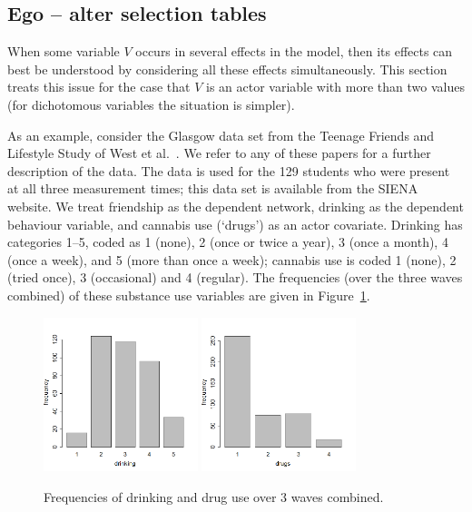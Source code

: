 \documentclass[a4paper,fleqn,11pt]{article}
\newcommand{\+}{\, + \,}
\newcommand{\SI}{{\sf SIENA }}
\begin{document}
\subsection{Ego -- alter selection tables}

When some variable $V$ occurs in several effects in the model,
then its effects can best be understood
by considering all these effects simultaneously.
This section treats this issue for the case that $V$ is an
actor variable with more than two values (for dichotomous
variables the situation is simpler).

As an example, consider the
Glasgow data set from the Teenage Friends and Lifestyle Study of
West et al.\ \citep{MichellWest1996,PearsonWest03,SteglichEA10}.
We refer to any of these papers for a further description of the data.
The data is used for the 129 students who were present at all three measurement
times; this data set is available from the \SI website.
We treat friendship as the dependent network, drinking as the
dependent behaviour variable, and cannabis use (`drugs') as an
actor covariate.
Drinking has categories 1--5, coded as
1 (none), 2 (once or twice a year), 3 (once a month), 4 (once a week),
and 5 (more than once a week);
cannabis use is coded 1 (none), 2 (tried once), 3 (occasional) and 4 (regular).
The frequencies (over the three waves combined) of these substance
use variables are given in Figure~\ref{F_DD}.

\begin{figure}
  \centering
  \includegraphics[width=0.4\textwidth]{TableDrinking.png}
  \hspace{1em}
  \includegraphics[width=0.4\textwidth]{TableDrugs.png}
  \caption{Frequencies of drinking and drug use over 3 waves combined.}\label{F_DD}
\end{figure}
\end{document}
